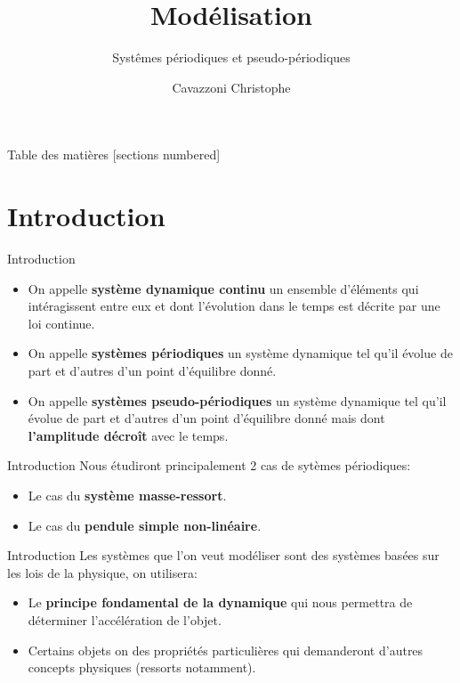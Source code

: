 \documentclass{beamer}
\title{Modélisation}
\subtitle{Systêmes périodiques et pseudo-périodiques}
\author{Cavazzoni Christophe}
\begin{document}
    \begin{frame}
        \titlepage
    \end{frame}
    \begin{frame}{Table des matières}
        [sections numbered]
        \tableofcontents
    \end{frame}
    
    \section{Introduction}
        \begin{frame}{Introduction}
            \begin{itemize}
                \item On appelle \textbf{système dynamique continu} un ensemble d'éléments qui intéragissent entre eux et dont l'évolution dans le temps est décrite par une loi continue.
                \item On appelle \textbf{systèmes périodiques} un système dynamique tel qu'il évolue de part et d'autres d'un point d'équilibre donné.
                \item On appelle \textbf{systèmes pseudo-périodiques} un système dynamique tel qu'il évolue de part et d'autres d'un point d'équilibre donné mais dont \textbf{l'amplitude décroît} avec le temps.
            \end{itemize}
        \end{frame}
        \begin{frame}{Introduction}
            Nous étudiront principalement 2 cas de sytèmes périodiques:
            \begin{itemize}
               \item Le cas du \textbf{système masse-ressort}.
               \item Le cas du \textbf{pendule simple non-linéaire}.
            \end{itemize}
        \end{frame}
        \begin{frame}{Introduction}
        Les systèmes que l'on veut modéliser sont des systèmes basées sur les lois de la physique, on utilisera:
            \begin{itemize}
            \item Le \textbf{principe fondamental de la dynamique} qui nous permettra de déterminer l'accélération de l'objet.
            \item Certains objets on des propriétés particulières qui demanderont d'autres concepts physiques (ressorts notamment).
            \end{itemize}
        \end{frame}
\end{document}
